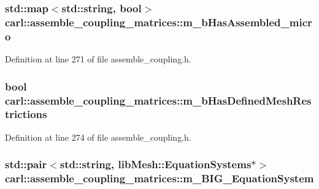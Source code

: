\subsubsection[{m\+\_\+b\+Has\+Assembled\+\_\+micro}]{\setlength{\rightskip}{0pt plus 5cm}std\+::map$<$std\+::string, bool$>$ carl\+::assemble\+\_\+coupling\+\_\+matrices\+::m\+\_\+b\+Has\+Assembled\+\_\+micro\hspace{0.3cm}{\ttfamily [protected]}}\label{classcarl_1_1assemble__coupling__matrices_a84f7dc1f435eabc152f0df50d7650269}


Definition at line 271 of file assemble\+\_\+coupling.\+h.

\hypertarget{classcarl_1_1assemble__coupling__matrices_aaed7135f088376664521b650c2b25fbd}{}
\subsubsection[{m\+\_\+b\+Has\+Defined\+Mesh\+Restrictions}]{\setlength{\rightskip}{0pt plus 5cm}bool carl\+::assemble\+\_\+coupling\+\_\+matrices\+::m\+\_\+b\+Has\+Defined\+Mesh\+Restrictions\hspace{0.3cm}{\ttfamily [protected]}}\label{classcarl_1_1assemble__coupling__matrices_aaed7135f088376664521b650c2b25fbd}


Definition at line 274 of file assemble\+\_\+coupling.\+h.

\hypertarget{classcarl_1_1assemble__coupling__matrices_a74638b62015299b30afb23168b141429}{}
\subsubsection[{m\+\_\+\+B\+I\+G\+\_\+\+Equation\+System}]{\setlength{\rightskip}{0pt plus 5cm}std\+::pair$<$std\+::string, lib\+Mesh\+::\+Equation\+Systems$\ast$$>$ carl\+::assemble\+\_\+coupling\+\_\+matrices\+::m\+\_\+\+B\+I\+G\+\_\+\+Equation\+System\hspace{0.3cm}{\ttfamily [protected]}}\label{classcarl_1_1assemble__coupling__matrices_a74638b62015299b30afb23168b141429}


